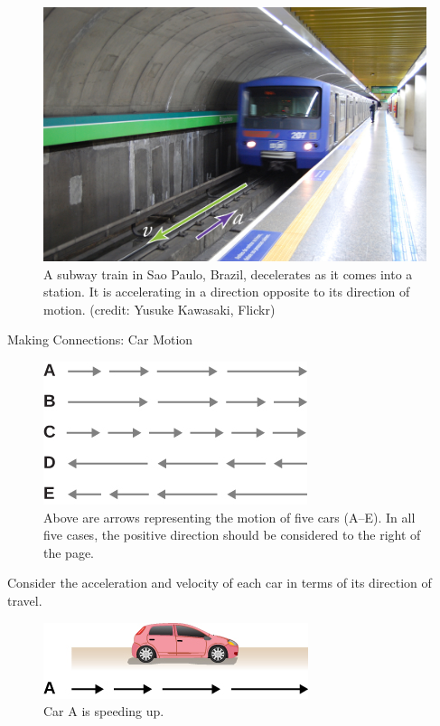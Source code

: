 \documentclass[
]{book}
\begin{document}
\begin{figure}
\hypertarget{import-auto-id1515319}{%
\centering
\includegraphics{images/Figure_02_04_00a.jpg}
\caption{A subway train in Sao Paulo, Brazil, decelerates as it comes into a
station. It is accelerating in a direction opposite to its direction of
motion. (credit: Yusuke Kawasaki,
Flickr)}\label{import-auto-id1515319}
}
\end{figure}

\hypertarget{fs-id1389422}{}
Making Connections: Car Motion

\begin{figure}
\hypertarget{import-auto-id3579626}{%
\centering
\includegraphics{images/Figure_Ch2_M4_01.jpg}
\caption{Above are arrows representing the motion of five cars (A--E). In all
five cases, the positive direction should be considered to the right of
the page.}\label{import-auto-id3579626}
}
\end{figure}

Consider the acceleration and velocity of each car in terms of its
direction of travel.

\begin{figure}
\hypertarget{fs-id2218162}{%
\centering
\includegraphics{images/Figure_Ch2_M4_02.jpg}
\caption{Car A is speeding up.}\label{fs-id2218162}
}
\end{figure}
\end{document}
